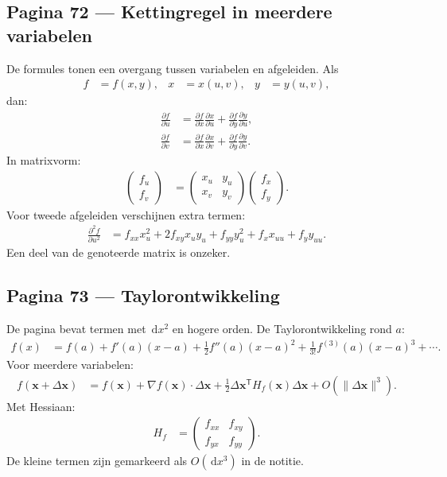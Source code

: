\documentclass[11pt]{article}
\newcommand{\dd}{\,\mathrm{d}}
\newcommand{\pd}[2]{\frac{\partial #1}{\partial #2}}
\newcommand{\vect}[1]{\mathbf{#1}}
\newcommand{\onzeker}[1]{\textcolor{red!70!black}{#1}}
\begin{document}
\subsection*{Pagina 72 --- Kettingregel in meerdere variabelen}

De formules tonen een overgang tussen variabelen en afgeleiden. Als
\begin{align*}
f&=f(x,y),
&
x&=x(u,v),
&
y&=y(u,v),
\end{align*}
dan:
\begin{align*}
\pd{f}{u}
&=
\pd{f}{x}\pd{x}{u}
+
\pd{f}{y}\pd{y}{u},\\
\pd{f}{v}
&=
\pd{f}{x}\pd{x}{v}
+
\pd{f}{y}\pd{y}{v}.
\end{align*}
In matrixvorm:
\begin{align*}
\begin{pmatrix}
f_u\\f_v
\end{pmatrix}
&=
\begin{pmatrix}
x_u & y_u\\
x_v & y_v
\end{pmatrix}
\begin{pmatrix}
f_x\\f_y
\end{pmatrix}.
\end{align*}
Voor tweede afgeleiden verschijnen extra termen:
\begin{align*}
\pd{^2 f}{u^2}
&=
f_{xx}x_u^2+2f_{xy}x_u y_u+f_{yy}y_u^2
+
f_x x_{uu}+f_y y_{uu}.
\end{align*}
Een deel van de genoteerde matrix is \onzeker{onzeker}.

\subsection*{Pagina 73 --- Taylorontwikkeling}

De pagina bevat termen met $\dd x^2$ en hogere orden. De Taylorontwikkeling rond $a$:
\begin{align*}
f(x)
&=
f(a)
+
f'(a)(x-a)
+
\frac{1}{2}f''(a)(x-a)^2
+
\frac{1}{3!}f^{(3)}(a)(x-a)^3
+\cdots.
\end{align*}
Voor meerdere variabelen:
\begin{align*}
f(\vect{x}+\Delta \vect{x})
&=
f(\vect{x})
+
\nabla f(\vect{x})\cdot \Delta \vect{x}
+
\frac{1}{2}\Delta \vect{x}^{\mathsf T}
H_f(\vect{x})
\Delta \vect{x}
+
O(\|\Delta \vect{x}\|^3).
\end{align*}
Met Hessiaan:
\begin{align*}
H_f
&=
\begin{pmatrix}
f_{xx} & f_{xy}\\
f_{yx} & f_{yy}
\end{pmatrix}.
\end{align*}
De kleine termen zijn gemarkeerd als \onzeker{$O(\dd x^3)$} in de notitie.
\end{document}
